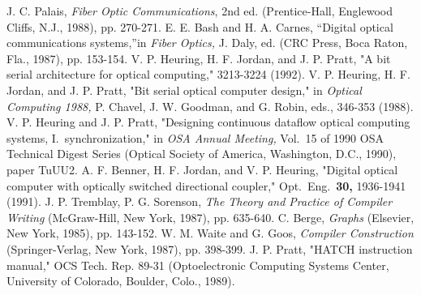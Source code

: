 \begin{references}
  J. C. Palais, {\it Fiber Optic Communications},  2nd
ed.  (Prentice-Hall, Englewood Cliffs, N.J., 1988), pp. 270-271.
  E. E. Bash and H. A. Carnes, ``Digital optical
communications  systems,''in {\it Fiber Optics,} J. Daly, ed. (CRC
          Press, Boca Raton, Fla., 1987), pp. 153-154.
V. P. Heuring, H. F. Jordan, and J. P. Pratt, "A bit serial
 architecture for optical computing,"  3213-3224
     (1992).   V. P. Heuring, H. F. Jordan, and J. P.
Pratt, "Bit serial optical            computer design," in {\it
Optical Computing 1988,} P. Chavel, J. W.            Goodman, and
G. Robin, eds.,  346-353 (1988).  V. P.
Heuring and  J. P. Pratt,  "Designing continuous dataflow
  optical computing systems, I.\ synchronization," in {\it OSA
Annual            Meeting,} Vol.\ 15 of 1990 OSA Technical Digest
Series           (Optical Society of America, Washington, D.C.,
1990), paper TuUU2.   A. F. Benner, H. F. Jordan, and V.
P. Heuring, "Digital optical            computer with optically
switched directional coupler,"  Opt.\ Eng.\             {\bf  30,}
1936-1941 (1991).
  J. P. Tremblay, P. G. Sorenson, {\it
The Theory and Practice of            Compiler Writing}
 (McGraw-Hill, New York, 1987), pp. 635-640.   C. Berge,
{\it Graphs}  (Elsevier, New York, 1985), pp. 143-152. 
W. M. Waite and G. Goos, {\it Compiler Construction}
(Springer-Verlag, New York, 1987), pp. 398-399.
 J. P.
Pratt, "HATCH instruction manual,"  OCS Tech. Rep.            89-31
(Optoelectronic Computing Systems Center, University of
Colorado,  Boulder, Colo., 1989).
\end{references}

